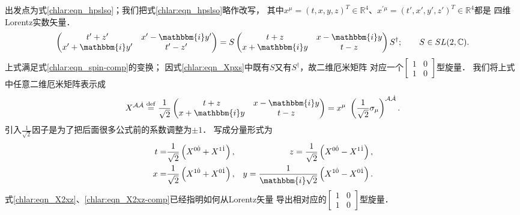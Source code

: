 出发点为式\eqref{chlar:eqn_hpslso}；我们把式\eqref{chlar:eqn_hpslso}略作改写，
其中$x^\mu= (t,x,y,z)^T \in \mathbb{R}^4 $、$x^{\prime\mu}= (t',x',y',z')^T \in \mathbb{R}^4 $都是
四维Lorentz实数矢量．
\begin{equation}\label{chlar:eqn_Xpxs}
    \begin{pmatrix}
        t'+z' & x'- \mathbbm{i} y' \\ x'+ \mathbbm{i} y' &   t'-z'
    \end{pmatrix} 
    =S\begin{pmatrix}
        t+z & x- \mathbbm{i} y \\ x+ \mathbbm{i} y &   t-z
    \end{pmatrix}S^\dagger; 
    \qquad S\in SL(2,\mathbb{C}) .
\end{equation}
上式满足式\eqref{chlar:eqn_spin-comp}的变换；
因式\eqref{chlar:eqn_Xpxs}中既有$S$又有$S^\dagger$，故二维厄米矩阵
对应一个$\left[\begin{smallmatrix} 1 &0\\ 1 &0\end{smallmatrix}\right]$型旋量．
我们将上式中任意二维厄米矩阵表示成
\begin{equation}\label{chlar:eqn_X2xz}
    X^{\mathcal{A}\dot{\mathcal{A}}} \overset{\mathrm {def}}{=} 
    \frac{1}{\sqrt{2}} \begin{pmatrix}
        t+z & x- \mathbbm{i} y \\ x+ \mathbbm{i} y & t-z
    \end{pmatrix} 
    =x^\mu \ \left(\frac{1}{\sqrt{2}} \sigma_\mu\right) ^{\mathcal{A}\dot{\mathcal{A}}} .
\end{equation}
引入$\frac{1}{\sqrt{2}}$因子是为了把后面很多公式前的系数调整为$\pm 1$．
写成分量形式为
\begin{equation}\label{chlar:eqn_X2xz-comp}
    \begin{aligned}
        t=&\frac{1}{\sqrt{2}} \left(X^{0\dot{0}} + X^{1\dot{1}}\right), &
        z=\frac{1}{\sqrt{2}} \left(X^{0\dot{0}} - X^{1\dot{1}}\right), \\
        x=&\frac{1}{\sqrt{2}} \left(X^{1\dot{0}} + X^{0\dot{1}}\right), &
        y=\frac{1}{\mathbbm{i}\sqrt{2}} \left(X^{1\dot{0}} - X^{0\dot{1}}\right) .
    \end{aligned}
\end{equation}
式\eqref{chlar:eqn_X2xz}、\eqref{chlar:eqn_X2xz-comp}已经指明如何从Lorentz矢量
导出相对应的$\left[\begin{smallmatrix} 1 &0\\ 1&0 \end{smallmatrix}\right]$型旋量．


